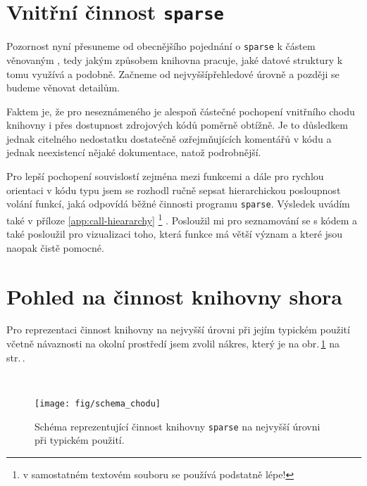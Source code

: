 \section{Vnitřní činnost \texttt{sparse}}

Pozornost nyní přesuneme od obecnějšího pojednání o \texttt{sparse}
k částem věnovaným , tedy jakým způsobem knihovna pracuje,
jaké datové struktury k tomu využívá a podobně. Začneme od nejvyšší\ndash{}přehledové
úrovně a později se budeme věnovat detailům.

Faktem je, že pro neseznámeného je alespoň částečné pochopení vnitřního
chodu knihovny i přes dostupnost zdrojových kódů poměrně obtížně.
Je to důsledkem jednak citelného nedostatku dostatečně
ozřejmňujících komentářů v kódu a jednak neexistencí nějaké
dokumentace, natož podrobnější.

Pro lepší pochopení souvislostí
zejména mezi funkcemi a dále pro rychlou orientaci v kódu typu
 jsem se rozhodl ručně sepsat hierarchickou posloupnost
volání funkcí, jaká odpovídá běžné činnosti programu \texttt{sparse}.
Výsledek uvádím také v příloze \ref{app:call-hieararchy}%
%
\footnote{v samostatném textovém souboru se používá podstatně lépe!}%
%
.
Posloužil mi pro seznamování se s kódem a také posloužil
pro vizualizaci toho, která funkce má větší význam a které jsou
naopak čistě pomocné.

\section{Pohled na činnost knihovny shora}

Pro reprezentaci činnost knihovny na nejvyšší úrovni
při jejím typickém použití včetně návaznosti na okolní
prostředí jsem zvolil nákres, který je na obr.\,\ref{fig:chod} na str.\,\pageref{fig:chod}.

\hspace*{\fill}\\[-\baselineskip]
\begin{figure}[!h]
    \begin{center}
        \texttt{[image: fig/schema\_chodu]}
        \label{fig:chod}
        \caption{Schéma reprezentující činnost knihovny \texttt{sparse} na nejvyšší úrovni
                 při typickém použití.}
    \end{center}
\end{figure}

